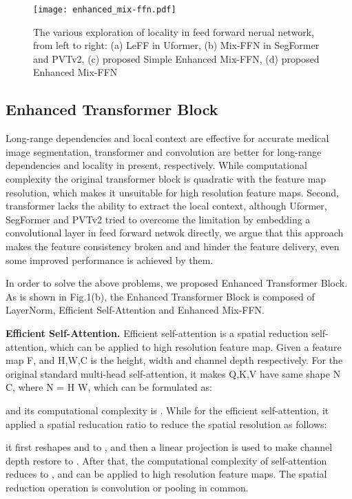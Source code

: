 \documentclass[letterpaper]{article} \usepackage{aaai22}  \usepackage{times}  \usepackage{helvet}  \usepackage{courier}  \usepackage[hyphens]{url}  \usepackage{graphicx} \urlstyle{rm} \def\UrlFont{\rm}  \usepackage{natbib}  \usepackage{caption} \DeclareCaptionStyle{ruled}{labelfont=normalfont,labelsep=colon,strut=off} \frenchspacing  \setlength{\pdfpagewidth}{8.5in}  \setlength{\pdfpageheight}{11in}  \usepackage{algorithm}
\begin{document}
\begin{figure*}[t]
	\centering
	\texttt{[image: enhanced\_mix-ffn.pdf]} \caption{The various exploration of locality in feed forward nerual network, from left to right: (a) LeFF in Uformer, (b) Mix-FFN in SegFormer and PVTv2, (c) proposed Simple Enhanced Mix-FFN, (d) proposed Enhanced Mix-FFN}
	\label{fig2}
\end{figure*}
\subsection{Enhanced Transformer Block}
Long-range dependencies and local context are effective for accurate medical image segmentation, transformer and convolution are better for long-range dependencies and locality in present, respectively. While computational complexity the original transformer block is quadratic with the feature map resolution, which makes it unsuitable for high resolution feature maps. Second, transformer lacks the ability to extract the local context\cite{Islam2020,Chu2021a,Li2021}, although Uformer, SegFormer and PVTv2 tried to overcome the limitation by embedding a convolutional layer in feed forward netwok directly, we argue that this approach makes the feature consistency broken and and hinder the feature delivery, even some improved performance is achieved by them. 

In order to solve the above problems, we proposed Enhanced Transformer Block. As is shown in Fig.1(b), the Enhanced Transformer Block is composed of LayerNorm, Efficient Self-Attention and Enhanced Mix-FFN.

\textbf{Efficient Self-Attention.} Efficient self-attention is a spatial reduction self-attention\cite{Wang2021}, which can be applied to high resolution feature map. Given a feature map F, and H,W,C is the height, width and channel depth respectively. For the original standard multi-head self-attention, it makes Q,K,V have same shape N \times C, where N = H \times W, which can be formulated as:

and its computational complexity is . While for the efficient self-attention, it applied a spatial reducation ratio  to  reduce the spatial resolution as follows:

it first reshapes  and  to , and then a linear projection  is used to make channel depth restore to . After that, the computational complexity of self-attention reduces to , and can be applied to high resolution feature maps. The spatial reduction operation is convolution or pooling in common.
\end{document}
